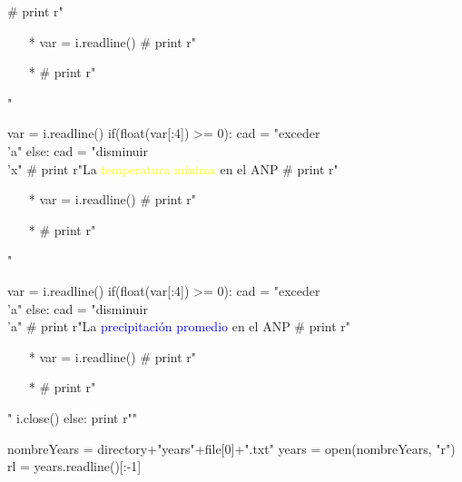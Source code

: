 \documentclass{article}
\begin{document}
\begin{python}
{		      # print r"\begin{itemize}"
		      # print r"\setlength\itemsep{1em}"
		      # print r"\item[*] %
		      var = i.readline()
		      # print r"\item[*] %
		      # print r"\end{itemize}"

		      var = i.readline()
		      if(float(var[:4]) >= 0):
		         cad = "exceder\\'a"
		      else:
		         cad = "disminuir\\'x"
		      # print r"La \textcolor{yellow}{temperatura m\'inima} en el ANP %
		      # print r"\begin{itemize}"
		      # print r"\setlength\itemsep{0em}"
		      # print r"\item[*] %
		      var = i.readline()
		      # print r"\item[*] %
		      # print r"\end{itemize}"

		      var = i.readline()
		      if(float(var[:4]) >= 0):
		         cad = "exceder\\'a"
		      else:
		         cad = "disminuir\\'a"
		      # print r"La \textcolor{blue}{precipitaci\'on promedio} en el ANP %
		      # print r"\begin{itemize}"
		      # print r"\item[*] %
		      var = i.readline()
		      # print r"\item[*] %
		      # print r"\end{itemize}"
		      i.close()
		   else:
		      print r""

		   nombreYears = directory+"years"+file[0]+".txt"
		   years = open(nombreYears, "r")
		   rl = years.readline()[:-1]

}
\end{python}
\end{document}
